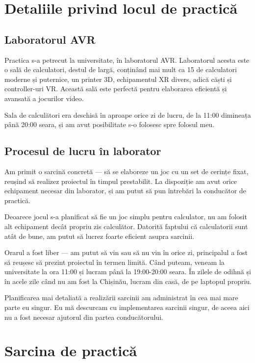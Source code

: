 \documentclass[a4paper,12pt]{report}
\begin{document}
\chapter{Detaliile privind locul de practică}


\section{Laboratorul AVR}

Practica s-a petrecut la universitate, în laboratorul AVR.
Laboratorul acesta este o sală de calculatori, destul de largă, conținând mai mult ca 15 de calculatori moderne și puternice, un printer \ac{3D}, echipamentul \ac{XR} divers, adică căști și controller-uri \ac{VR}.
Această sală este perfectă pentru elaborarea eficientă și avansată a jocurilor video.

Sala de calculători era deschisă în aproape orice zi de lucru, de la 11:00 dimineața până 20:00 seara, și am avut posibilitate s-o folosesc spre folosul meu.


\section{Procesul de lucru în laborator}

Am primit o sarcină concretă --- să se elaboreze un joc cu un set de cerințe fixat, reușind să realizez proiectul în timpul prestabilit.
La dispoziție am avut orice echipament necesar din laborator, și am putut să pun întrebări la conducător de practică.

Deoarece jocul s-a planificat să fie un joc simplu pentru calculator, nu am folosit alt echipament decât propriu zis calculător.
Datorită faptului că calculatorii sunt atât de bune, am putut să lucrez foarte eficient asupra sarcinii.

Orarul a fost liber --- am putut să vin sau să nu vin în orice zi, principalul a fost să reușesc să prezint proiectul în termen limită.
Când puteam, veneam la universitate la ora 11:00 și lucram până la 19:00-20:00 seara.
În zilele de odihnă și în acele zile când nu am fost la Chișinău, lucram din casă, de pe laptopul propriu.

Planificarea mai detaliată a realizării sarcinii am administrat în cea mai mare parte eu singur.
Eu mă descurcam cu implementarea sarcinii singur, de aceea aici nu a fost necesar ajutorul din partea conducătorului.


\chapter{Sarcina de practică}
\end{document}

